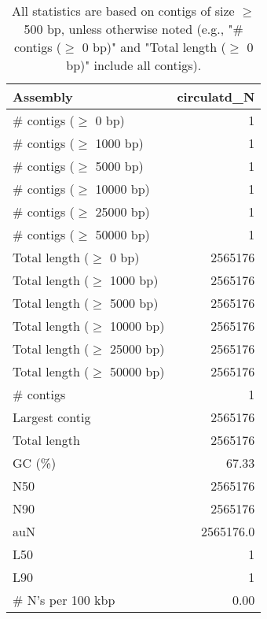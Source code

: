 \documentclass[12pt,a4paper]{article}
\begin{document}
\begin{table}[ht]
\begin{center}
\caption{All statistics are based on contigs of size $\geq$ 500 bp, unless otherwise noted (e.g., "\# contigs ($\geq$ 0 bp)" and "Total length ($\geq$ 0 bp)" include all contigs).}
\begin{tabular}{|l*{1}{|r}|}
\hline
Assembly & circulatd\_N \\ \hline
\# contigs ($\geq$ 0 bp) & 1 \\ \hline
\# contigs ($\geq$ 1000 bp) & 1 \\ \hline
\# contigs ($\geq$ 5000 bp) & 1 \\ \hline
\# contigs ($\geq$ 10000 bp) & 1 \\ \hline
\# contigs ($\geq$ 25000 bp) & 1 \\ \hline
\# contigs ($\geq$ 50000 bp) & 1 \\ \hline
Total length ($\geq$ 0 bp) & 2565176 \\ \hline
Total length ($\geq$ 1000 bp) & 2565176 \\ \hline
Total length ($\geq$ 5000 bp) & 2565176 \\ \hline
Total length ($\geq$ 10000 bp) & 2565176 \\ \hline
Total length ($\geq$ 25000 bp) & 2565176 \\ \hline
Total length ($\geq$ 50000 bp) & 2565176 \\ \hline
\# contigs & 1 \\ \hline
Largest contig & 2565176 \\ \hline
Total length & 2565176 \\ \hline
GC (\%) & 67.33 \\ \hline
N50 & 2565176 \\ \hline
N90 & 2565176 \\ \hline
auN & 2565176.0 \\ \hline
L50 & 1 \\ \hline
L90 & 1 \\ \hline
\# N's per 100 kbp & 0.00 \\ \hline
\end{tabular}
\end{center}
\end{table}
\end{document}
